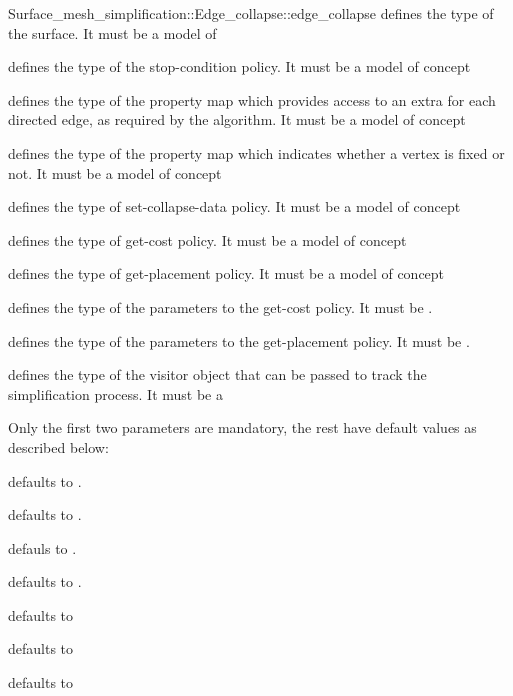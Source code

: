 \begin{ccRefFunction}{Surface_mesh_simplification::Edge_collapse::edge_collapse}
 defines the type of the surface.
It must be a model of 

 defines the type of the stop-condition policy.
It must be a model of  concept

 defines the type of the property map which 
provides access to an extra  for each directed edge,
as required by the algorithm.
It must be a model of  concept

 defines the type of the property map which 
indicates whether a vertex is fixed or not.
It must be a model of  concept

 defines the type of set-collapse-data policy.
It must be a model of  concept

 defines the type of get-cost policy.
It must be a model of  concept

 defines the type of get-placement policy.
It must be a model of  concept

 defines the type of the parameters to the get-cost policy.
It must be .

 defines the type of the parameters to the get-placement policy.
It must be .

 defines the type of the visitor object that can be passed to track the 
simplification process.
It must be a 


Only the first two parameters are mandatory, the rest have default values as described below:

 defaults to .

 defaults to .

 defauls to .

 defaults to .

 defaults to 

 defaults to 

 defaults to 

\end{ccRefFunction}



